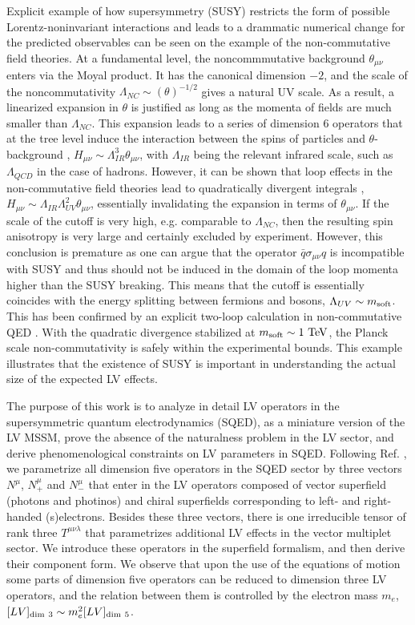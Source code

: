 \documentclass[12pt]{revtex4}
\begin{document}
Explicit example of how  supersymmetry (SUSY) restricts the form of possible 
Lorentz-noninvariant interactions and leads to a drammatic numerical change 
for the predicted observables can be seen on the example of the
non-commutative field theories.  At a fundamental level, the
noncommmutative background  
$\theta_{\mu\nu}$ enters via the Moyal product. It has the canonical 
dimension $-2$, and the scale of the noncommutativity $\Lambda_{NC}
\sim(\theta)^{-1/2}$ gives a natural UV scale. 
As a result, a linearized expansion in $\theta$ is justified 
as long as the momenta of fields  are much smaller than $\Lambda_{NC}$. 
This expansion leads to a series of dimension 6 operators
that at the tree level induce the interaction between the spins of 
particles and $\theta$-background \cite{MPR1}, $H_{\mu\nu} \sim \Lambda_{IR}^3\theta_{\mu\nu}$,
with $ \Lambda_{IR}$ being the relevant infrared scale, such as $\Lambda_{QCD}$ 
in the case of hadrons. However, it can be shown that loop effects in the 
non-commutative field theories lead to quadratically divergent integrals \cite{UCSC},
$H_{\mu\nu} \sim \Lambda_{IR}\Lambda_{UV}^2\theta_{\mu\nu}$, essentially
invalidating the expansion in terms of $\theta_{\mu\nu}$. 
If the scale of the cutoff is very high, e.g. comparable to $\Lambda_{NC}$, 
then the resulting spin anisotropy is very large and certainly excluded 
by experiment. However, this conclusion is premature as 
one can argue that the operator $\bar q \sigma_{\mu\nu} q$ 
is incompatible with SUSY \cite{MPR2} and thus should not be induced 
in the domain of the loop momenta higher than the SUSY breaking. 
This means that the cutoff is essentially coincides with the 
energy splitting between fermions and bosons, $\Lambda_{UV} \sim m_{\rm soft}$. 
This has been confirmed by an explicit two-loop calculation in non-commutative 
QED \cite{WMC2}. With the quadratic divergence stabilized at 
$m_{\rm soft}\sim 1~{\rm TeV}$,
the Planck scale non-commutativity is safely within the experimental 
bounds. This example illustrates that the existence of SUSY is important in 
understanding the actual size of the expected LV effects. 

The purpose of this work is to analyze in detail LV operators in 
the supersymmetric quantum electrodynamics (SQED),
as a miniature version of the LV MSSM, prove the absence of the
naturalness problem in the LV sector, and derive phenomenological
constraints on LV parameters in SQED.  Following
Ref. \cite{GrootNibbelink:2004za}, we  parametrize all dimension five
operators in the SQED sector  by three vectors $N^{\mu}$,
$N^{\mu}_+$ and $N^{\mu}_-$
that enter in the LV operators composed  of vector superfield (photons and photinos) and chiral
superfields corresponding to left- and right-handed (s)electrons. 
Besides these three vectors, there is one irreducible tensor of rank three $T^{\mu\nu\lambda}$ 
that parametrizes additional LV effects in the vector multiplet sector. 
We introduce these operators in the superfield formalism, and then
derive their component form. We observe that upon the use of the
equations of motion some parts of dimension five operators can be
reduced to dimension three LV operators, and the relation  
between them is controlled by the electron mass $m_e$,  
$[LV]_{\rm dim~3} \sim m_e^2 [LV]_{\rm dim~5}$.
\end{document}

